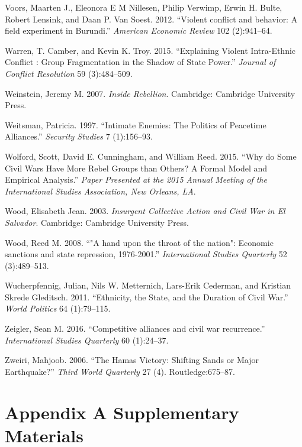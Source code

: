 \documentclass[12pt,]{book}
\theoremstyle{definition}
\theoremstyle{definition}
\theoremstyle{definition}
\theoremstyle{remark}
\begin{document}
\leavevmode\hypertarget{ref-Voors2012}{}%
Voors, Maarten J., Eleonora E M Nillesen, Philip Verwimp, Erwin H.
Bulte, Robert Lensink, and Daan P. Van Soest. 2012. ``Violent conflict
and behavior: A field experiment in Burundi.'' \emph{American Economic
Review} 102 (2):941--64.

\leavevmode\hypertarget{ref-Warren2015}{}%
Warren, T. Camber, and Kevin K. Troy. 2015. ``Explaining Violent
Intra-Ethnic Conflict : Group Fragmentation in the Shadow of State
Power.'' \emph{Journal of Conflict Resolution} 59 (3):484--509.

\leavevmode\hypertarget{ref-Weinstein2007}{}%
Weinstein, Jeremy M. 2007. \emph{Inside Rebellion}. Cambridge: Cambridge
University Press.

\leavevmode\hypertarget{ref-Weitsman1997}{}%
Weitsman, Patricia. 1997. ``Intimate Enemies: The Politics of Peacetime
Alliances.'' \emph{Security Studies} 7 (1):156--93.

\leavevmode\hypertarget{ref-Wolford}{}%
Wolford, Scott, David E. Cunningham, and William Reed. 2015. ``Why do
Some Civil Wars Have More Rebel Groups than Others? A Formal Model and
Empirical Analysis.'' \emph{Paper Presented at the 2015 Annual Meeting
of the International Studies Association, New Orleans, LA}.

\leavevmode\hypertarget{ref-Wood2003}{}%
Wood, Elisabeth Jean. 2003. \emph{Insurgent Collective Action and Civil
War in El Salvador}. Cambridge: Cambridge University Press.

\leavevmode\hypertarget{ref-Wood2008a}{}%
Wood, Reed M. 2008. ``"A hand upon the throat of the nation": Economic
sanctions and state repression, 1976-2001.'' \emph{International Studies
Quarterly} 52 (3):489--513.

\leavevmode\hypertarget{ref-Wucherpfennig2011}{}%
Wucherpfennig, Julian, Nils W. Metternich, Lars-Erik Cederman, and
Kristian Skrede Gleditsch. 2011. ``Ethnicity, the State, and the
Duration of Civil War.'' \emph{World Politics} 64 (1):79--115.

\leavevmode\hypertarget{ref-Zeigler2016}{}%
Zeigler, Sean M. 2016. ``Competitive alliances and civil war
recurrence.'' \emph{International Studies Quarterly} 60 (1):24--37.

\leavevmode\hypertarget{ref-Zweiri2006}{}%
Zweiri, Mahjoob. 2006. ``The Hamas Victory: Shifting Sands or Major
Earthquake?'' \emph{Third World Quarterly} 27 (4). Routledge:675--87.


\hypertarget{appendix-a-supplementary-materials}{%
\chapter{Appendix A Supplementary
Materials}\label{appendix-a-supplementary-materials}}
\end{document}
